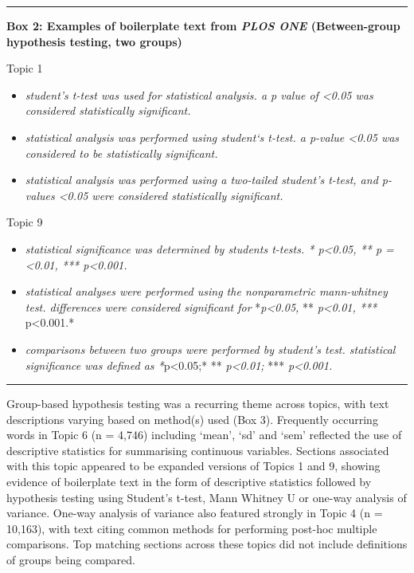 \documentclass[
]{article}
\providecommand{\tightlist}{%
  \setlength{\itemsep}{0pt}\setlength{\parskip}{0pt}}
\begin{document}
\begin{center}\rule{0.5\linewidth}{0.5pt}\end{center}

\textbf{Box 2: Examples of boilerplate text from \emph{PLOS ONE} (Between-group hypothesis testing, two groups)}

Topic 1

\begin{itemize}
\tightlist
\item
  \emph{student's t-test was used for statistical analysis. a p value of \textless0.05 was considered statistically significant.}
\item
  \emph{statistical analysis was performed using student`s t-test. a p-value \textless0.05 was considered to be statistically significant.}
\item
  \emph{statistical analysis was performed using a two-tailed student's t-test, and p-values \textless0.05 were considered statistically significant.}
\end{itemize}

Topic 9

\begin{itemize}
\tightlist
\item
  \emph{statistical significance was determined by students t-tests. * p\textless0.05, ** p = \textless0.01, *** p\textless0.001.}
\item
  \emph{statistical analyses were performed using the nonparametric mann-whitney test. differences were considered significant for} *\emph{p\textless0.05,} ** \emph{p\textless0.01, *** }p\textless0.001.*
\item
  \emph{comparisons between two groups were performed by student's test. statistical significance was defined as *}p\textless0.05;* ** \emph{p\textless0.01;} *** \emph{p\textless0.001.}
\end{itemize}

\begin{center}\rule{0.5\linewidth}{0.5pt}\end{center}

Group-based hypothesis testing was a recurring theme across topics, with text descriptions varying based on method(s) used (Box 3). Frequently occurring words in Topic 6 (n = 4,746) including `mean', `sd' and `sem' reflected the use of descriptive statistics for summarising continuous variables. Sections associated with this topic appeared to be expanded versions of Topics 1 and 9, showing evidence of boilerplate text in the form of descriptive statistics followed by hypothesis testing using Student's t-test, Mann Whitney U or one-way analysis of variance. One-way analysis of variance also featured strongly in Topic 4 (n = 10,163), with text citing common methods for performing post-hoc multiple comparisons. Top matching sections across these topics did not include definitions of groups being compared.
\end{document}

